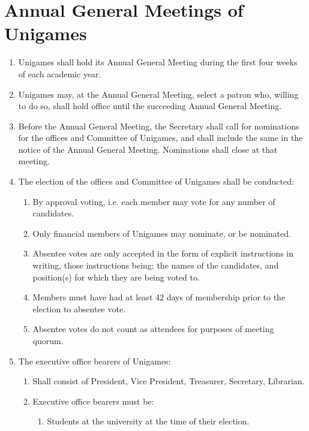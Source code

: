 \documentclass[a4paper]{article}
\begin{document}
\section{Annual General Meetings of Unigames} \label{sec:annual_general_meetings}
\begin{enumerate}
    \item Unigames shall hold its Annual General Meeting during the first four weeks of each academic year.
    \item Unigames may, at the Annual General Meeting, select a patron who, willing to do so, shall hold office until the succeeding Annual General Meeting.
    \item Before the Annual General Meeting, the Secretary shall call for nominations for the offices and Committee of Unigames, and shall include the same in the notice of the Annual General Meeting. Nominations shall close at that meeting.
    \item The election of the offices and Committee of Unigames shall be conducted:
          \begin{enumerate}
              \item By approval voting, i.e. each member may vote for any number of candidates.
              \item Only financial members of Unigames may nominate, or be nominated.
              \item Absentee votes are only accepted in the form of explicit instructions in writing, those instructions being; the names of the candidates, and position(s) for which they are being voted to.
              \item Members must have had at least 42 days of membership prior to the election to absentee vote.
              \item Absentee votes do not count as attendees for purposes of meeting quorum.
          \end{enumerate}
    \item The executive office bearers of Unigames:
          \begin{enumerate}
              \item Shall consist of President, Vice President, Treasurer, Secretary, Librarian.
              \item \label{item:guild_exec_rules} Executive office bearers must be:
                    \begin{enumerate}
                        \item Students at the university at the time of their election.

\end{enumerate}
\end{enumerate}
\end{enumerate}
\end{document}
